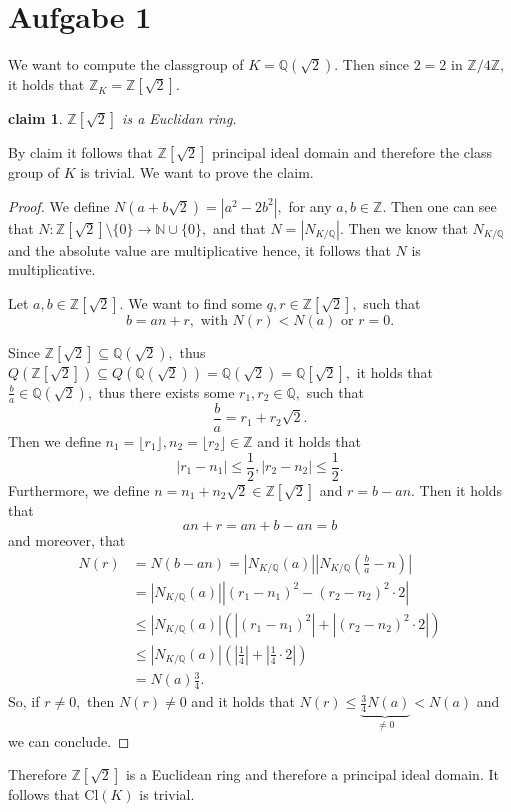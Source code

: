 \documentclass[10pt,a4paper]{article}
\date{\today}
\newtheorem*{claim*}{claim}
\newcommand{\QQ}{\mathbb{Q}}
\newcommand{\ZZ}{\mathbb{Z}}
\begin{document}
	
\section*{Aufgabe 1}
We want to compute the classgroup of $K = \QQ(\sqrt{2}).$ Then since $2 = 2$ in $\ZZ/4\ZZ,$ it holds that $\ZZ_K = \ZZ[\sqrt{2}].$
\begin{claim*}
	$\ZZ[\sqrt{2}]$ is a Euclidan ring. 
\end{claim*}

By claim it follows that $\ZZ[\sqrt{2}]$ principal ideal domain and therefore the class group of $K$ is trivial. We want to prove the claim.

\begin{proof}
	We define $N(a+b\sqrt{2}) = |a^2 - 2b^2|,$ for any $a,b\in \ZZ.$ Then one can see that $N:\ZZ[\sqrt{2}]\setminus \{0\}\to \mathbb{N}\cup \{0\},$ and that $N = | N_{K/\QQ} |.$ Then we know that $N_{K/\QQ}$ and the absolute value are multiplicative hence, it follows that $N$ is multiplicative. 
	
	Let $a, b\in \ZZ[\sqrt{2}].$ We want to  find some $q,r\in \ZZ[\sqrt{2}],$ such that
	\[b = an+r, \text{ with } N(r)<N(a) \text{ or } r = 0.\]
	
	Since $\ZZ[\sqrt{2}]\subseteq \QQ(\sqrt{2}),$ thus $Q(\ZZ[\sqrt{2}])\subseteq Q(\QQ(\sqrt{2})) = \QQ(\sqrt{2}) = \QQ[\sqrt{2}],$ it holds that $\frac{b}{a}\in \QQ(\sqrt{2}),$ thus there exists some $r_1, r_2\in \QQ,$ such that
	\[\frac{b}{a} = r_1 + r_2\sqrt{2}.\]
	Then we define $n_1 = \lfloor r_1\rfloor, n_2 = \lfloor r_2\rfloor\in \ZZ$ and it holds that 
	\[|r_1-n_1|\leq \frac{1}{2}, |r_2 - n_2|\leq \frac{1}{2}.\]
	Furthermore, we define $n = n_1 + n_2\sqrt{2}\in \ZZ[\sqrt{2}]$ and $r = b-an.$
	Then it holds that
	\[an + r = an +b -an  = b\]
	and moreover, that
	\begin{align*}
		N(r) &= N(b - an) = \left|N_{K/\QQ}(a)\right|\left|N_{K/\QQ}\left(\frac{b}{a} - n\right)\right|\\
		&= \left|N_{K/\QQ}(a)\right|\left|(r_1 - n_1)^2 - (r_2 - n_2)^2\cdot 2\right|\\
		&\leq \left|N_{K/\QQ}(a)\right|\left(\left|(r_1 - n_1)^2\right| + \left|(r_2 - n_2)^2\cdot 2\right|\right)\\
		&\leq \left|N_{K/\QQ}(a)\right|\left(\left|\frac{1}{4}\right| + \left|\frac{1}{4}\cdot 2\right|\right)\\
		&= N(a)\frac{3}{4}.
	\end{align*}
	So, if $r\neq 0,$ then $N(r)\neq 0$ and it holds that $N(r) \leq \underbrace{\frac{3}{4}N(a)}_{\neq0}<N(a)$ and we can conclude.
\end{proof}
Therefore $\ZZ[\sqrt{2}]$ is a Euclidean ring and therefore a principal ideal domain. It follows that $\mathrm{Cl}(K)$ is trivial.
\end{document}
